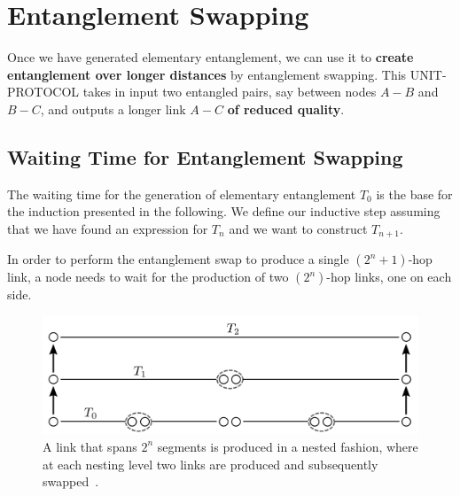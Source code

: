 \documentclass{masterthesis}
\begin{document}


\section{Entanglement Swapping}

Once we have generated elementary entanglement, we can use it to \textbf{create entanglement over longer distances} by entanglement swapping.
This UNIT-PROTOCOL takes in input two entangled pairs, say between nodes $A-B$ and $B-C$, and outputs a longer link $A-C$ \textbf{of reduced quality}. 

\subsection{Waiting Time for Entanglement Swapping}

The waiting time for the generation of elementary entanglement $T_0$ is the base for the induction presented in the following.
We define our inductive step assuming that we have found an expression for $T_n$ and we want to construct $T_{n+1}$. 

In order to perform the entanglement swap to produce a single $(2^n+1)$-hop link, a node needs to wait for the production of two $(2^n)$-hop links, one on each side. 

\begin{figure}[ht]
    \centering
    \includegraphics[width=\linewidth]{images/swap.png}
    \caption{A link that spans $2^n$ segments is produced in a nested fashion, where at each nesting level two links are produced and subsequently swapped~\cite{Li_2021}.}\label{fig:entanglement_swapping}
\end{figure}
\end{document}
